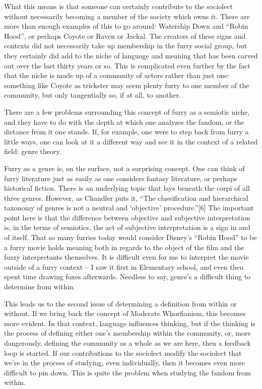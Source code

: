 What this means is that someone can certainly contribute to the sociolect without necessarily becoming a member of the society which owns it. There are more than enough examples of this to go around: Watership Down and ``Robin Hood'', or perhaps Coyote or Raven or Jackal. The creators of these signs and contexts did not necessarily take up membership in the furry social group, but they certainly did add to the niche of language and meaning that has been carved out over the last thirty years or so. This is complicated even further by the fact that the niche is made up of a community of actors rather than just one: something like Coyote as trickster may seem plenty furry to one member of the community, but only tangentially so, if at all, to another.

There are a few problems surrounding this concept of furry as a semiotic niche, and they have to do with the depth at which one analyzes the fandom, or the distance from it one stands. If, for example, one were to step back from furry a little ways, one can look at it a different way and see it in the context of a related field: genre theory.

Furry as a genre is, on the surface, not a surprising concept. One can think of furry literature just as easily as one considers fantasy literature, or perhaps historical fiction. There is an underlying topic that lays beneath the corpi of all three genres. However, as Chandler puts it, ``The classification and hierarchical taxonomy of genres is not a neutral and `objective' procedure.''[6] The important point here is that the difference between objective and subjective interpretation is, in the terms of semiotics, the act of subjective interpretation is a sign in and of itself. That so many furries today would consider Disney's ``Robin Hood'' to be a furry movie holds meaning both in regards to the object of the film and the fuzzy interpretants themselves. It is difficult even for me to interpret the movie outside of a furry context -- I saw it first in Elementary school, and even then spent time drawing foxes afterwards. Needless to say, genre's a difficult thing to determine from within.

This leads us to the second issue of determining a definition from within or without. If we bring back the concept of Moderate Whorfianism, this becomes more evident. In that context, language influences thinking, but if the thinking is the process of defining either one's membership within the community, or, more dangerously, defining the community as a whole as we are here, then a feedback loop is started. If our contributions to the sociolect modify the sociolect that we're in the process of studying, even individually, then it becomes even more difficult to pin down. This is quite the problem when studying the fandom from within.

